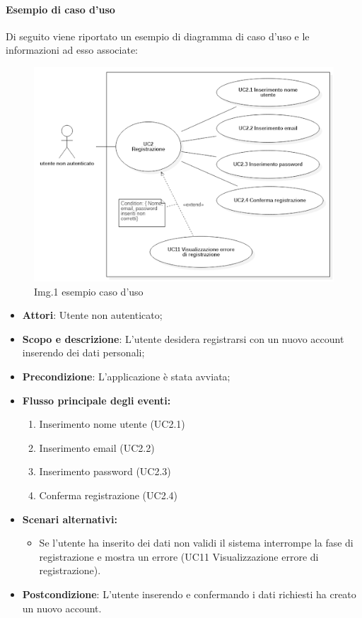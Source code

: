 			\paragraph{Esempio di caso d’uso}
				Di seguito viene riportato un esempio di diagramma di caso d’uso e le informazioni ad esso associate:
					\begin{figure}[H]
    						\centering
    						\includegraphics[width=1.0\textwidth]{res/images/esempio_caso_d_uso.png}
						\caption{Img.1 esempio caso d'uso}
						\label{fig:Img.1 esempio caso d'uso: UC2 Registrazione}
					\end{figure}
				\begin{itemize}
					\item\textbf{Attori}: Utente non autenticato;
					\item\textbf{Scopo e descrizione}: L’utente desidera registrarsi con un nuovo account inserendo dei dati personali;
					\item\textbf{Precondizione}: L’applicazione è stata avviata;
					\item\textbf{Flusso principale degli eventi:}
						\begin{enumerate}
							\item Inserimento nome utente (UC2.1)
							\item Inserimento email (UC2.2)
							\item Inserimento password (UC2.3)
							\item Conferma registrazione (UC2.4)
						\end{enumerate}
					\item\textbf{Scenari alternativi:}
						\begin{itemize}
							\item Se l’utente ha inserito dei dati non validi il sistema interrompe la fase di registrazione e mostra un errore (UC11 Visualizzazione errore di registrazione).
						\end{itemize}
					\item\textbf{Postcondizione}: L’utente inserendo e confermando i dati richiesti ha creato un nuovo account.
				\end{itemize}
			

